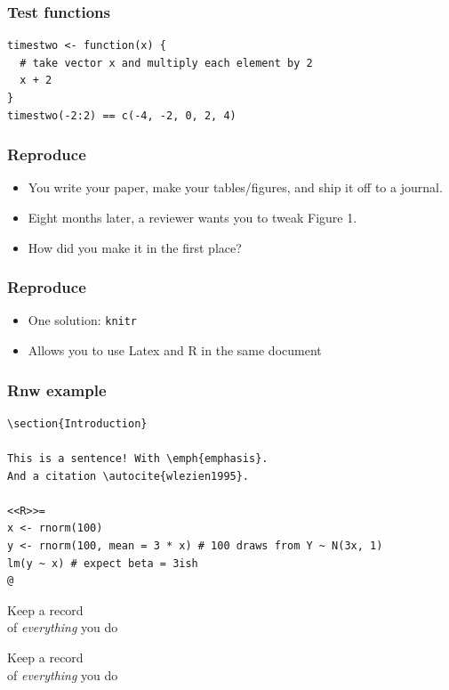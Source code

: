 \documentclass[bigger, aspectratio=169]{beamer}
\begin{document}
\begin{frame}[fragile]
  \frametitle{Test functions}
  \begin{verbatim}
timestwo <- function(x) {
  # take vector x and multiply each element by 2
  x + 2 
}
timestwo(-2:2) == c(-4, -2, 0, 2, 4)
\end{verbatim}

\end{frame}

\begin{frame}
  \frametitle{Reproduce}
  \begin{itemize}
  \item You write your paper, make your tables/figures, and ship it off to a journal.
  \item Eight months later, a reviewer wants you to tweak Figure 1.
  \item How did you make it in the first place? 
  \end{itemize}
\end{frame}

\begin{frame}
  \frametitle{Reproduce}
  \begin{itemize}
  \item One solution: \texttt{knitr}
  \item Allows you to use Latex and R in the same document
  \end{itemize}
\end{frame}

\begin{frame}[fragile]
  \frametitle{Rnw example}
\begin{verbatim}
\section{Introduction}

This is a sentence! With \emph{emphasis}. 
And a citation \autocite{wlezien1995}. 

<<R>>=
x <- rnorm(100) 
y <- rnorm(100, mean = 3 * x) # 100 draws from Y ~ N(3x, 1)
lm(y ~ x) # expect beta = 3ish
@
\end{verbatim}
\end{frame}

\begin{frame}[standout]
  Keep a record \\
  of \emph{everything} you do\\
\end{frame}

\begin{frame}[standout]
  \Huge{Keep a record} \\
  \Huge{of \emph{everything} you do}\\
\end{frame}
\end{document}
